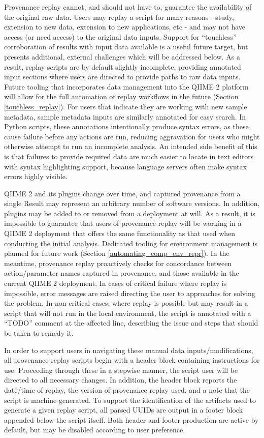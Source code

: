 Provenance replay cannot, and should not have to, guarantee the availability of
the original raw data. Users may replay a script for many reasons - study,
extension to new data, extension to new applications, etc - and may not have
access (or need access) to the original data inputs. Support for “touchless”
corroboration of results with input data available is a useful future target,
but presents additional, external challenges which will be addressed below. As a
result, replay scripts are by default slightly incomplete, providing annotated
input sections where users are directed to provide paths to raw data inputs.
Future tooling that incorporates data management into the QIIME 2 platform will
allow for the full automation of replay workflows in the future (Section
\ref{touchless_replay}). For users that indicate they are working with new sample metadata,
sample metadata inputs are similarly annotated for easy search. In Python
scripts, these annotations intentionally produce syntax errors, as these cause
failure before any actions are run, reducing aggravation for users who might
otherwise attempt to run an incomplete analysis. An intended side benefit of
this is that failures to provide required data are much easier to locate in text
editors with syntax highlighting support, because language servers often make
syntax errors highly visible.

QIIME 2 and its plugins change over time, and captured provenance from a single
Result may represent an arbitrary number of software versions. In addition,
plugins may be added to or removed from a deployment at will. As a result, it is
impossible to guarantee that users of provenance replay will be working in a
QIIME 2 deployment that offers the same functionality as that used when
conducting the initial analysis. Dedicated tooling for environment management is
planned for future work (Section \ref{automating_comp_env_repr}). In the
meantime, provenance replay proactively checks for concordance between
action/parameter names captured in provenance, and those available in the
current QIIME 2 deployment. In cases of critical failure where replay is
impossible, error messages are raised directing the user to approaches for
solving the problem. In non-critical cases, where replay is possible but may
result in a script that will not run in the local environment, the script is
annotated with a “TODO” comment at the affected line, describing the issue and
steps that should be taken to remedy it.

In order to support users in navigating these manual data inputs/modifications,
all provenance replay scripts begin with a header block containing instructions
for use. Proceeding through these in a stepwise manner, the script user will be
directed to all necessary changes. In addition, the header block reports the
date/time of replay, the version of provenance replay used, and a note that the
script is machine-generated. To support the identification of the artifacts used
to generate a given replay script, all parsed UUIDs are output in a footer block
appended below the script itself. Both header and footer production are active
by default, but may be disabled according to user preference.


